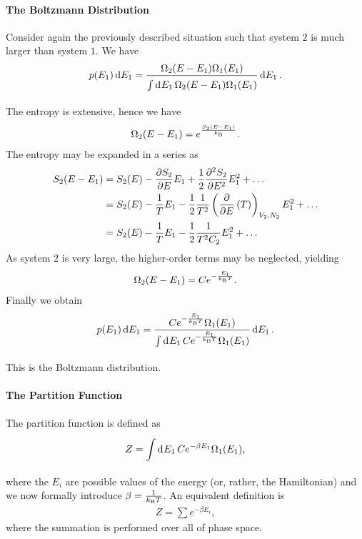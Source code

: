 \paragraph{The Boltzmann Distribution}
Consider again the previously described situation such that system $2$ is much larger than system $1$. We have
\begin{align*}
	p(E_{1})\dd{E_{1}} = \frac{\Omega_{2}(E - E_{1})\Omega_{1}(E_{1})}{\int\limits_{}^{}\dd[]{E_{1}}\Omega_{2}(E - E_{1})\Omega_{1}(E_{1})}\dd{E_{1}}.
\end{align*}
The entropy is extensive, hence we have
\begin{align*}
	\Omega_{2}(E - E_{1}) = e^{\frac{S_{2}(E - E_{1})}{k_{\text{B}}}}.
\end{align*}
The entropy may be expanded in a series as
\begin{align*}
	S_{2}(E - E_{1}) &= S_{2}(E) - \pdv{S_{2}}{E}E_{1} + \frac{1}{2}\pdv[2]{S_{2}}{E}E_{1}^{2} + \dots \\
	                 &= S_{2}(E) - \frac{1}{T}E_{1} - \frac{1}{2}\frac{1}{T^{2}}\left(\pdv{E}\left(T\right)\right)_{V_{2}, N_{2}}E_{1}^{2} + \dots \\
	                 &= S_{2}(E) - \frac{1}{T}E_{1} - \frac{1}{2}\frac{1}{T^{2}C_{2}}E_{1}^{2} + \dots
\end{align*}
As system $2$ is very large, the higher-order terms may be neglected, yielding
\begin{align*}
	\Omega_{2}(E - E_{1}) = Ce^{-\frac{E_{1}}{k_{\text{B}} T}}.
\end{align*}
Finally we obtain
\begin{align*}
	p(E_{1})\dd{E_{1}} = \frac{Ce^{-\frac{E_{1}}{k_{\text{B}} T}}\Omega_{1}(E_{1})}{\int\limits_{}^{}\dd[]{E_{1}}Ce^{-\frac{E_{1}}{k_{\text{B}} T}}\Omega_{1}(E_{1})}\dd{E_{1}}.
\end{align*}
This is the Boltzmann distribution.

\paragraph{The Partition Function}
The partition function is defined as
\begin{align*}
	Z = \int\limits_{}^{}\dd[]{E_{1}}Ce^{-\beta E_{1}}\Omega_{1}(E_{1}),
\end{align*}
where the $E_{i}$ are possible values of the energy (or, rather, the Hamiltonian) and we now formally introduce $\beta = \frac{1}{k_{\text{B}} T}$. An equivalent definition is
\begin{align*}
	Z = \sum e^{-\beta E_{i}},
\end{align*}
where the summation is performed over all of phase space.

